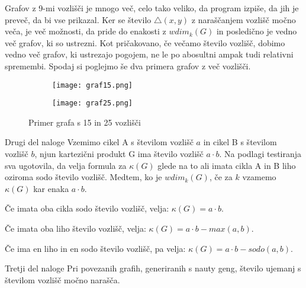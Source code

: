 \documentclass[12pt,a4paper]{amsart}
\makeatletter
\renewcommand\subsection{\@startsection{subsection}{2}%
  \z@{.5\linespacing\@plus.7\linespacing}{.5\linespacing}%
  {\normalfont\scshape}}
\theoremstyle{plain} %
\makeatother
\begin{document}
Grafov z 9-mi vozlišči je mnogo več, celo tako veliko,
da program izpiše, da jih je preveč, da bi vse prikazal. Ker se število $\triangle(x,y)$ z naraščanjem vozlišč močno veča,
je več možnosti, da pride do enakosti z $wdim_k(G)$ in posledično je vedno več grafov, ki so ustrezni. Kot pričakovano, če 
večamo število vozlišč, dobimo vedno več grafov, ki ustrezajo pogojem, ne le po abosultni ampak tudi relativni spremembi.
Spodaj si poglejmo še dva primera grafov z več vozlišči. 
\bigskip

\bigskip

\bigskip
\begin{figure}[h]
    \centering
    \begin{subfigure}{0.25\textwidth}
    \centering
    \texttt{[image: graf15.png]}
    \end{subfigure}
    \begin{subfigure}{0.25\textwidth}
    \centering
    \texttt{[image: graf25.png]}
    \end{subfigure}
    \caption{Primer grafa s 15 in 25 vozlišči}
    \label{fig:slika2}
\end{figure}%
    
\subsection{Drugi del naloge}
Vzemimo cikel A s številom vozlišč $a$ in cikel B s številom vozlišč $b$, njun kartezični produkt G ima število vozlišč $a \cdot b$. 
Na podlagi testiranja sva ugotovila, da velja formula za $\kappa(G)$ glede na to ali imata cikla A in B liho oziroma sodo število vozlišč. 
Medtem, ko je $wdim_k(G)$, če za $k$ vzamemo $\kappa(G)$ kar enaka $a \cdot b$.

Če imata oba cikla sodo število vozlišč, velja: $\kappa(G) = a \cdot b$.

Če imata oba liho število vozlišč, velja: $\kappa(G) = a \cdot b - max(a,b)$.

Če ima en liho in en sodo število vozlišč, pa velja: $\kappa(G) = a \cdot b - sodo(a,b)$.

\bigskip

\subsection{Tretji del naloge}
Pri povezanih grafih, generiranih s nauty geng, število ujemanj s številom vozlišč močno narašča.
\end{document}

